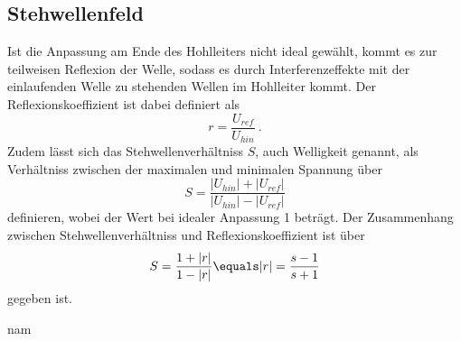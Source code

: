 \subsection{Stehwellenfeld}
Ist die Anpassung am Ende des Hohlleiters nicht ideal gewählt, kommt es zur teilweisen Reflexion
der Welle, sodass es durch Interferenzeffekte mit der einlaufenden Welle zu stehenden
Wellen im Hohlleiter kommt. Der Reflexionskoeffizient ist dabei definiert als
\begin{equation}
    r= \frac{U_{ref}}{U_{hin}} \:.
  \label{eqn:refl}
\end{equation}
Zudem lässt sich das Stehwellenverhältniss $S$, auch Welligkeit genannt, als Verhältniss
zwischen der maximalen und minimalen Spannung über
\begin{equation}
    S= \frac{\lvert U_{hin}\rvert + \lvert U_{ref}\rvert}{\lvert U_{hin}\rvert - \lvert U_{ref}\rvert}
  \label{eqn:SWV}
\end{equation}
definieren, wobei der Wert bei idealer Anpassung 1 beträgt. Der Zusammenhang zwischen Stehwellenverhältniss
und Reflexionskoeffizient ist über
\begin{equation}
    S= \frac{1 + \lvert r\rvert}{1 - \lvert r\rvert} \equals \lvert r\rvert = \frac{s-1}{s+1}
  \label{eqn:reflundSWV}
\end{equation}
gegeben ist.













nam
